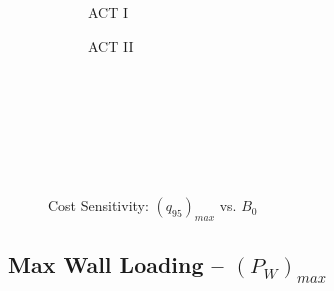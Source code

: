 \begin{figure*}[h!]
\begin{subfigure}[t]{0.45\textwidth}
        \centering
    \begin{adjustbox}{width=\textwidth}
      \Large
      
    \end{adjustbox}
        \caption{ACT I}
    \end{subfigure}
    \hfill
    \begin{subfigure}[t]{0.45\textwidth}
        \centering
    \begin{adjustbox}{width=\textwidth}
      \Large
      
    \end{adjustbox}
        \caption{ACT II}
    \end{subfigure}
    \hfill \hfill ~\\ ~\\ ~\\ ~\\
  \caption[]{Cost Sensitivity: $({q_{95}})_{max}$ vs. $B_0$} ~\\
\end{figure*}


\clearpage

\newpage

\subsection*{ Max Wall Loading -- $({P_W})_{max}$ }
  \label{subsection:sensitivity_max_P_W}

